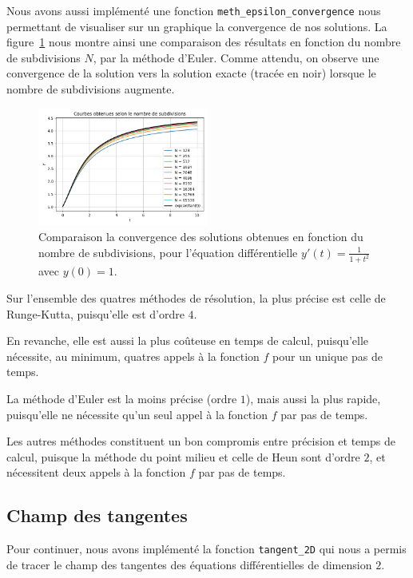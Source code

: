 Nous avons aussi implémenté une fonction \texttt{meth\_epsilon\_convergence} nous permettant de visualiser
sur un graphique la convergence de nos solutions.
La figure~\ref{fig:subdivision} nous montre ainsi une comparaison des résultats en fonction
du nombre de subdivisions $N$, par la méthode d'Euler.
Comme attendu, on observe une convergence de la solution vers la solution exacte (tracée en noir)
lorsque le nombre de subdivisions augmente.

\begin{figure}[htbp!]
	\centering
	\includegraphics[width=0.5\textwidth]{res/subdivisions}
	\caption{Comparaison la convergence des solutions obtenues en fonction du nombre de subdivisions, pour l'équation différentielle $y'(t) = \frac{1}{1 + t^2}$ avec $y(0) = 1$.}
	\label{fig:subdivision}
\end{figure}

Sur l'ensemble des quatres méthodes de résolution, la plus précise est celle de Runge-Kutta, puisqu'elle est d'ordre $4$.

En revanche, elle est aussi la plus coûteuse en temps de calcul, puisqu'elle nécessite, au minimum, quatres appels à la fonction $f$ pour un unique pas de temps.

La méthode d'Euler est la moins précise (ordre $1$), mais aussi la plus rapide, puisqu'elle ne nécessite qu'un seul appel à la fonction $f$ par pas de temps.

Les autres méthodes constituent un bon compromis entre précision et temps de calcul, puisque la méthode du point milieu et celle de Heun sont d'ordre $2$, et nécessitent deux appels à la fonction $f$ par pas de temps.

\subsection{Champ des tangentes}
Pour continuer, nous avons implémenté la fonction \texttt{tangent\_2D} qui nous a permis de tracer le champ des tangentes
des équations différentielles de dimension $2$.

